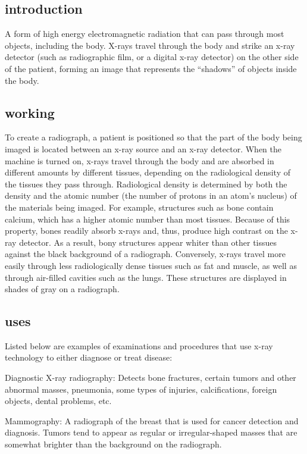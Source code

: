 \documentclass{article}
\begin{document}
\subsection{introduction}

A form of high energy electromagnetic radiation that can pass through most objects, including the body. X-rays travel through the body and strike an x-ray detector (such as radiographic film, or a digital x-ray detector) on the other side of the patient, forming an image that represents the “shadows” of objects inside the body. 

\subsection{working}

To create a radiograph, a patient is positioned so that the part of the body being imaged is located between an x-ray source and an x-ray detector. When the machine is turned on, x-rays travel through the body and are absorbed in different amounts by different tissues, depending on the radiological density of the tissues they pass through. Radiological density is determined by both the density and the atomic number (the number of protons in an atom’s nucleus) of the materials being imaged. For example, structures such as bone contain calcium, which has a higher atomic number than most tissues. Because of this property, bones readily absorb x-rays and, thus, produce high contrast on the x-ray detector. As a result, bony structures appear whiter than other tissues against the black background of a radiograph. Conversely, x-rays travel more easily through less radiologically dense tissues such as fat and muscle, as well as through air-filled cavities such as the lungs. These structures are displayed in shades of gray on a radiograph.
\subsection{uses}

Listed below are examples of examinations and procedures that use x-ray technology to either diagnose or treat disease:

Diagnostic
X-ray radiography: Detects bone fractures, certain tumors and other abnormal masses, pneumonia, some types of injuries, calcifications, foreign objects, dental problems, etc.

Mammography: A radiograph of the breast that is used for cancer detection and diagnosis. Tumors tend to appear as regular or irregular-shaped masses that are somewhat brighter than the background on the radiograph.
\end{document}
